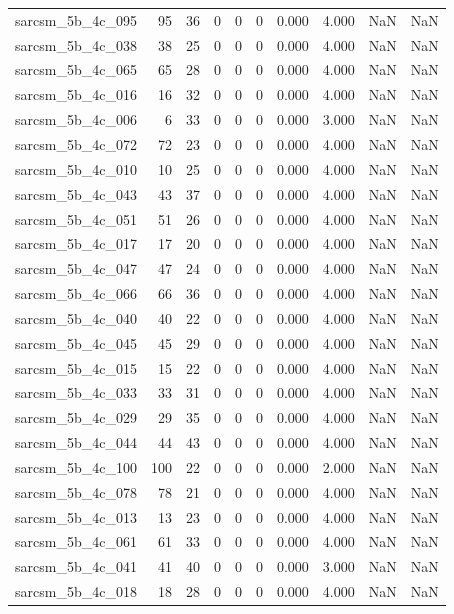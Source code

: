 \documentclass{article}
\begin{document}
\begin{longtable}{lrrrrrrrrr}
sarcsm\_5b\_4c\_095 & 95 & 36 & 0 & 0 & 0 & 0.000 & 4.000 & NaN & NaN \\
sarcsm\_5b\_4c\_038 & 38 & 25 & 0 & 0 & 0 & 0.000 & 4.000 & NaN & NaN \\
sarcsm\_5b\_4c\_065 & 65 & 28 & 0 & 0 & 0 & 0.000 & 4.000 & NaN & NaN \\
sarcsm\_5b\_4c\_016 & 16 & 32 & 0 & 0 & 0 & 0.000 & 4.000 & NaN & NaN \\
sarcsm\_5b\_4c\_006 & 6 & 33 & 0 & 0 & 0 & 0.000 & 3.000 & NaN & NaN \\
sarcsm\_5b\_4c\_072 & 72 & 23 & 0 & 0 & 0 & 0.000 & 4.000 & NaN & NaN \\
sarcsm\_5b\_4c\_010 & 10 & 25 & 0 & 0 & 0 & 0.000 & 4.000 & NaN & NaN \\
sarcsm\_5b\_4c\_043 & 43 & 37 & 0 & 0 & 0 & 0.000 & 4.000 & NaN & NaN \\
sarcsm\_5b\_4c\_051 & 51 & 26 & 0 & 0 & 0 & 0.000 & 4.000 & NaN & NaN \\
sarcsm\_5b\_4c\_017 & 17 & 20 & 0 & 0 & 0 & 0.000 & 4.000 & NaN & NaN \\
sarcsm\_5b\_4c\_047 & 47 & 24 & 0 & 0 & 0 & 0.000 & 4.000 & NaN & NaN \\
sarcsm\_5b\_4c\_066 & 66 & 36 & 0 & 0 & 0 & 0.000 & 4.000 & NaN & NaN \\
sarcsm\_5b\_4c\_040 & 40 & 22 & 0 & 0 & 0 & 0.000 & 4.000 & NaN & NaN \\
sarcsm\_5b\_4c\_045 & 45 & 29 & 0 & 0 & 0 & 0.000 & 4.000 & NaN & NaN \\
sarcsm\_5b\_4c\_015 & 15 & 22 & 0 & 0 & 0 & 0.000 & 4.000 & NaN & NaN \\
sarcsm\_5b\_4c\_033 & 33 & 31 & 0 & 0 & 0 & 0.000 & 4.000 & NaN & NaN \\
sarcsm\_5b\_4c\_029 & 29 & 35 & 0 & 0 & 0 & 0.000 & 4.000 & NaN & NaN \\
sarcsm\_5b\_4c\_044 & 44 & 43 & 0 & 0 & 0 & 0.000 & 4.000 & NaN & NaN \\
sarcsm\_5b\_4c\_100 & 100 & 22 & 0 & 0 & 0 & 0.000 & 2.000 & NaN & NaN \\
sarcsm\_5b\_4c\_078 & 78 & 21 & 0 & 0 & 0 & 0.000 & 4.000 & NaN & NaN \\
sarcsm\_5b\_4c\_013 & 13 & 23 & 0 & 0 & 0 & 0.000 & 4.000 & NaN & NaN \\
sarcsm\_5b\_4c\_061 & 61 & 33 & 0 & 0 & 0 & 0.000 & 4.000 & NaN & NaN \\
sarcsm\_5b\_4c\_041 & 41 & 40 & 0 & 0 & 0 & 0.000 & 3.000 & NaN & NaN \\
sarcsm\_5b\_4c\_018 & 18 & 28 & 0 & 0 & 0 & 0.000 & 4.000 & NaN & NaN \\

\end{longtable}
\end{document}
